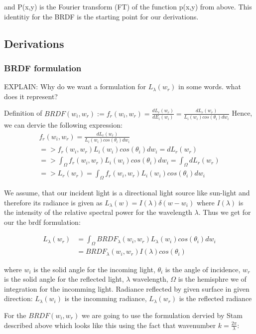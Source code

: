 and P(x,y) is the Fourier transform (FT) of the function p(x,y) from above.
This identitiy for the BRDF is the starting point for our derivations.


\subsection{Derivations}
\subsubsection{BRDF formulation}

EXPLAIN: Why do we want a formulation for $L_{\lambda}(w_r)$ in some words. what does it represent?

Definition of $BRDF(w_i, w_r) := f_r(w_i, w_r) = \frac{dL_r(w_r)}{dE_i(w_i)}=\frac{dL_r(w_r)}{L_i(w_i)cos(\theta_i)dw_i}$  
Hence, we can dervie the following expression:
\begin{align*}
f_r(w_i, w_r) = \frac{dL_r(w_r)}{L_i(w_i)cos(\theta_i)dw_i} \\
=> f_r(w_i, w_r) L_i(w_i)cos(\theta_i)dw_i = dL_r(w_r) \\
=> \int_{\Omega}f_r(w_i, w_r) L_i(w_i)cos(\theta_i)dw_i = \int_{\Omega}dL_r(w_r) \\
=> L_r(w_r) = \int_{\Omega}f_r(w_i, w_r) L_i(w_i)cos(\theta_i)dw_i
\end{align*}

We assume, that our incident light is a directional light source like sun-light and therefore its radiance is given as $L_{\lambda}(w)=I(\lambda)\delta(w-w_i)$ where $I(\lambda)$ is the intensity of the relative spectral power for the wavelength $\lambda$. Thus we get for our the brdf formulation:

\begin{align}
L_{\lambda}(w_r) 
& = \int_{\Omega} BRDF_{\lambda}(w_i, w_r) L_{\lambda}(w_i) cos(\theta_i) dw_i \\
& = BRDF_{\lambda}(w_i, w_r) I(\lambda) cos(\theta_i)
\end{align}

where $w_i$ is the solid angle for the incoming light, $\theta{_i}$ is the angle of incidence,
$w_r$ is the solid angle for the reflected light, $\lambda$ wavelength, $\Omega$ is the hemisphre we of integration for the incomming light.
Radiance reflected by given surface in given direction:
$L_{\lambda}(w_i)$ is the incomming radiance, $L_{\lambda}(w_r)$ is the reflected radiance

For the $BRDF(w_i, w_r)$ we are going to use the formulation dervied by Stam described above which looks like this using the fact that wavenumber $k=\frac{2\pi}{\lambda}$:

